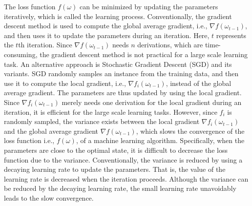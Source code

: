 \documentclass[preprint,review,11pt,a4paper]{elsarticle}
\begin{document}
The loss function $f(\omega)$ can be minimized by updating the parameters iteratively, which is called the learning process. Conventionally, the gradient descent method is used to compute the global average gradient, i.e., $\nabla f(\omega_{t-1})$, and then uses it to update the parameters during an iteration. Here, $t$ represents the $t$th iteration. Since $\nabla f(\omega_{t-1})$ needs $n$ derivations, which are time-consuming, the gradient descent method is not practical for a large scale learning task.  An alternative approach  is Stochastic  Gradient Descent (SGD) and its variants. SGD randomly samples an instance from the training data, and then use it to compute the local gradient, i.e., $\nabla f_i(\omega_{t-1})$, instead of the global average gradient.   The parameters are thus updated by using the local gradient. Since $\nabla f_i(\omega_{t-1})$ merely needs one derivation for the local gradient during an iteration,  it is efficient for the large scale learning tasks.  However, since $f_i$ is randomly sampled, the variance exists between the local gradient $\nabla f_i(\omega_{t-1})$ and the global average gradient $\nabla f(\omega_{t-1})$, which slows the convergence of the loss function i.e., $f(\omega)$, of a machine learning algorithm.  Specifically, when the parameters are close to the optimal state, it is difficult to decrease the loss function due to the variance. Conventionally, the variance is reduced by using a decaying learning rate to update the parameters. That is,  the value of the learning rate is decreased when the iteration proceeds. Although the variance can be reduced by the decaying learning rate, the small learning rate unavoidably  leads to the slow convergence.
\end{document}

